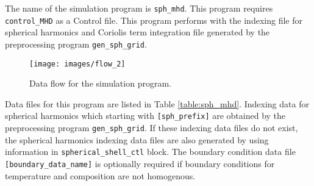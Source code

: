 The name of the simulation program is {\tt sph\_mhd}. This program requires {\tt control\_MHD} as a Control file. This program performs with the indexing file for spherical harmonics and Coriolis term integration file generated by the preprocessing program {\tt gen\_sph\_grid}.
%
\begin{figure}[htbp]
\begin{center}
\texttt{[image: images/flow\_2]}
\end{center}
\caption{Data flow for the simulation program.}
\label{fig:flow_2}
\end{figure}
%
Data files for this program are listed in Table \ref{table:sph_mhd}. Indexing data for spherical harmonics which starting with \verb|[sph_prefix]| are obtained by the preprocessing program \verb|gen_sph_grid|. If these indexing data files do not exist, the spherical harmonics indexing data files are also generated by using information in \verb|spherical_shell_ctl| block. The boundary condition data file \verb|[boundary_data_name]| is optionally required if boundary conditions for temperature and composition are not homogenous.
%
